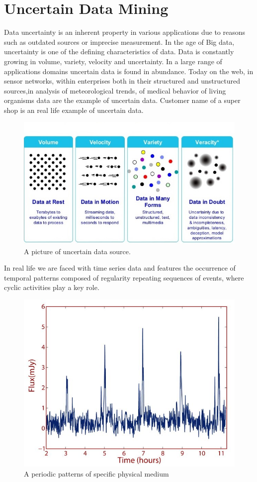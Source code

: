 \section{Uncertain Data Mining}
Data uncertainty is an inherent property in various applications due to reasons such as outdated sources or imprecise measurement. In the age of Big data, uncertainty is one of the defining characteristics of data. Data is constantly growing in volume, variety, velocity and uncertainty. In a large range of applications domains uncertain data is found in abundance.  Today on the web, in sensor networks, within enterprises both in their structured and unstructured sources,in analysis of meteorological trends, of medical behavior of living organisms data are the example of uncertain data. Customer name of a super shop is an real life example of uncertain data.

\begin{figure}[h!]
  \centering
    \includegraphics[width=1\textwidth]{images/ra_1}
    \caption{A picture of uncertain data source.}
\end{figure}
In real life we are faced with time series data and features the occurrence of temporal patterns composed of regularity repeating sequences of events, where cyclic activities play a key role.
\begin{figure}
\includegraphics[width=1\textwidth]{images/ra_2}
\caption{A periodic patterns of specific physical medium}
\label{fig:Periodic time series}
\end{figure}
